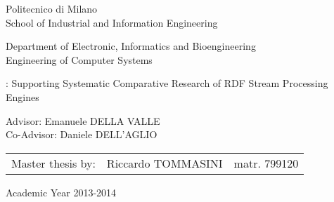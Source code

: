 \begin{titlepage}
\vspace*{-2.5cm}
\bfseries
\begin{center}
  \LARGE
  Politecnico di Milano\\
  \Large
  School of Industrial and Information Engineering\\


\begin{large}
Department of Electronic, Informatics and Bioengineering\\
Engineering of Computer Systems\\
\end{large}

\vspace{1.0cm}
\begin{Large}
\namens: Supporting Systematic Comparative Research of RDF Stream Processing Engines
\end{Large}  
\end{center}
\vspace*{4.5cm}
\large
\begin{flushleft}
\hspace{-2cm}  Advisor: Emanuele DELLA VALLE\\
\hspace{-2cm}  Co-Advisor: Daniele DELL'AGLIO\\
\end{flushleft}
\vspace*{1.5cm}

\hspace{1.5cm}
\parbox{14cm}{
    \begin{tabular}{lll}
        Master thesis by: & Riccardo TOMMASINI    & matr. 799120\\
    \end{tabular}
}

\vspace*{1.4cm}
\begin{center}

  Academic Year 2013-2014



\end{center}
\end{titlepage}
\cleardoublepage

\thispagestyle{empty}

